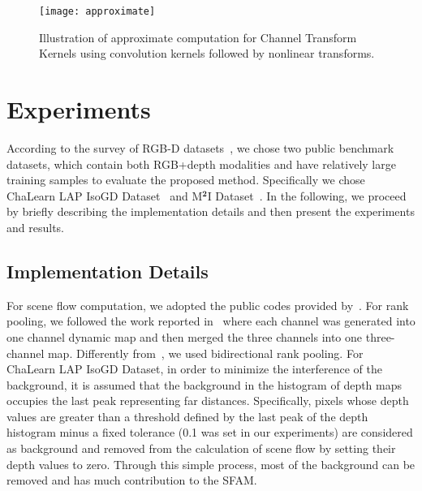 \documentclass[10pt,twocolumn,letterpaper]{article}
\begin{document}
\begin{figure}[t]
\begin{center}
{\texttt{[image: approximate]}}
\end{center}
\caption{Illustration of approximate computation for Channel Transform Kernels 
using convolution kernels followed by nonlinear transforms. }
\label{approximate}
\end{figure}

\section{Experiments}\label{results}

According to the survey of RGB-D datasets~\cite{zhang2016rgb}, we chose two 
public benchmark datasets, which contain both RGB+depth modalities and have 
relatively large training samples to evaluate the proposed method. Specifically 
we chose ChaLearn LAP IsoGD Dataset~\cite{wanchalearn} and 
M$^{\textbf{2}}$I Dataset~\cite{liu2016benchmarking}. In the following, we 
proceed by briefly describing the implementation details and then present 
the experiments and results.

\subsection{Implementation Details}

For scene flow computation, we adopted the public codes provided 
by~\cite{jaimezprimal}.
For rank pooling, we followed the work reported in~\cite{bilen2016dynamic} where 
each channel was generated into one channel dynamic map and then merged 
the three channels into one three-channel map. Differently 
from~\cite{bilen2016dynamic}, we used bidirectional rank pooling. For ChaLearn 
LAP IsoGD Dataset, in order to minimize the interference of the background, it 
is assumed that the background in the histogram of depth maps occupies the last 
peak representing far distances. Specifically, pixels whose depth values are 
greater than a threshold defined by the last peak of the depth histogram minus a 
fixed tolerance (0.1 was set in our experiments) are considered as background 
and removed from the calculation of scene flow by setting their depth values 
to zero. Through this simple process, most of the background can be removed and 
has much contribution to the SFAM.
\end{document}
